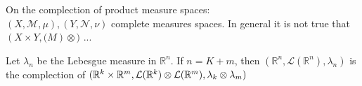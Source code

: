 \begin{remark}
    On the complection of product measure spaces: \\
    \(\left(X, \mathcal{M}, \mu \right), \left(Y, \mathcal{N}, \nu \right)\) complete measures spaces. In general it is not true that \((X \times Y, \mathbb(M) \otimes \mathbb{})\)
    ...
\end{remark}

\begin{theorem}
    Let \(\lambda_n\) be the Lebesgue measure in \(\mathbb{R}^n\). If \(n= K+m\), then \(\left(\mathbb{R}^n, \mathcal{L}(\mathbb{R}^n), \lambda_n \right)\) is the complection of \( ( \mathbb{R}^k \times \mathbb{R}^m, \mathcal{L}(\mathbb{R}^k) \otimes \mathcal{L}(\mathbb{R}^m),\lambda_k \otimes \lambda_m )\)
\end{theorem}
